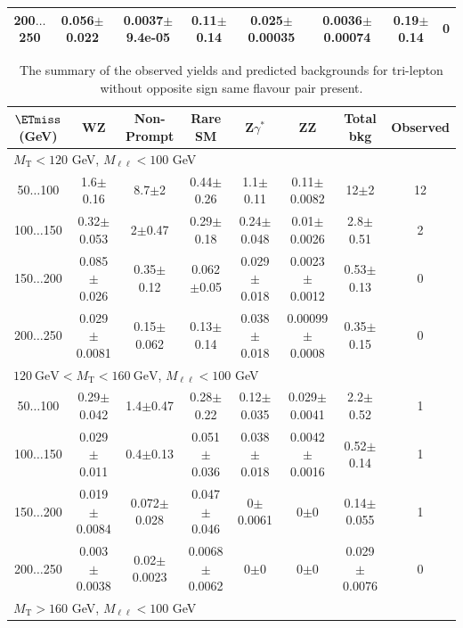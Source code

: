 \begin{landscape}
\begin{table}
\begin{center}
\begin{tabular}{| c | c c c c c c c | }
200$\dots$250&0.056$\pm$0.022&0.0037$\pm$9.4e-05&0.11$\pm$0.14&0.025$\pm$0.00035&0.0036$\pm$0.00074&0.19$\pm$0.14&0\\
\hline\hline
\end{tabular}
\end{center}
\end{table}
\begin{table}
\small
\begin{center}
\caption{\label{tab:OSSF0tau0} The summary of the observed yields and predicted backgrounds for tri-lepton 
without opposite sign same flavour pair present. }
\begin{tabular}{| c | c c c c c c c | }\hline\hline
$\ETmiss$ (GeV) & WZ & Non-Prompt & Rare SM & Z$\gamma^*$ & ZZ & Total bkg & Observed\\\hline\hline
\multicolumn{8}{l}{$M_{\text{T}} < 120$ GeV, $M_{\ell\ell} < 100$ GeV}\\\hline\hline
50$\dots$100&1.6$\pm$0.16&8.7$\pm$2&0.44$\pm$0.26&1.1$\pm$0.11&0.11$\pm$0.0082&12$\pm$2&12\\
100$\dots$150&0.32$\pm$0.053&2$\pm$0.47&0.29$\pm$0.18&0.24$\pm$0.048&0.01$\pm$0.0026&2.8$\pm$0.51&2\\
150$\dots$200&0.085$\pm$0.026&0.35$\pm$0.12&0.062$\pm$0.05&0.029$\pm$0.018&0.0023$\pm$0.0012&0.53$\pm$0.13&0\\
200$\dots$250&0.029$\pm$0.0081&0.15$\pm$0.062&0.13$\pm$0.14&0.038$\pm$0.018&0.00099$\pm$0.0008&0.35$\pm$0.15&0\\
\hline\hline
\multicolumn{8}{l}{$120~\mathrm{GeV} < M_{\text{T}} < 160~\mathrm{GeV}$, $M_{\ell\ell} < 100$ GeV}\\\hline\hline
50$\dots$100&0.29$\pm$0.042&1.4$\pm$0.47&0.28$\pm$0.22&0.12$\pm$0.035&0.029$\pm$0.0041&2.2$\pm$0.52&1\\
100$\dots$150&0.029$\pm$0.011&0.4$\pm$0.13&0.051$\pm$0.036&0.038$\pm$0.018&0.0042$\pm$0.0016&0.52$\pm$0.14&1\\
150$\dots$200&0.019$\pm$0.0084&0.072$\pm$0.028&0.047$\pm$0.046&0$\pm$0.0061&0$\pm$0&0.14$\pm$0.055&1\\
200$\dots$250&0.003$\pm$0.0038&0.02$\pm$0.0023&0.0068$\pm$0.0062&0$\pm$0&0$\pm$0&0.029$\pm$0.0076&0\\
\hline\hline
\multicolumn{8}{l}{$M_{\text{T}} > 160$ GeV, $M_{\ell\ell} < 100$ GeV}\\\hline\hline

\end{tabular}
\end{center}
\end{table}
\end{landscape}
